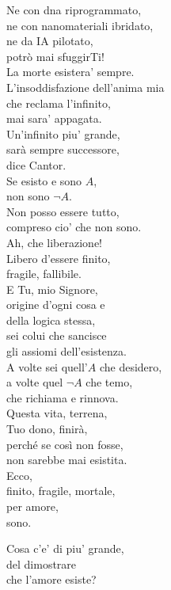 \begin{haiku}
    Ne con dna riprogrammato,\\
    ne con nanomateriali ibridato, \\
    ne da IA pilotato, \\
    potrò mai sfuggirTi! \\
    La morte esistera' sempre.\\
    L'insoddisfazione dell'anima mia\\
    che reclama l'infinito,\\
    mai sara' appagata.\\
    Un'infinito piu' grande,\\
    sarà sempre successore,\\
    dice Cantor. \\
    Se esisto e sono $A$,\\
    non sono $\lnot A$.\\
    Non posso essere tutto,\\
    compreso cio' che non sono.\\
    Ah, che liberazione!\\
    Libero d'essere finito, \\
	fragile, fallibile.\\
    E Tu, mio Signore,\\
    origine d'ogni cosa e\\
    della logica stessa,\\
    sei colui che sancisce\\
    gli assiomi dell'esistenza.\\
    A volte sei quell'$A$ che desidero,\\
    a volte quel $\lnot A$ che temo,\\
    che richiama e rinnova.\\
    Questa vita, terrena, \\
    Tuo dono, finirà,\\
    perché se così non fosse,\\
    non sarebbe mai esistita.\\
    Ecco,\\
    finito, fragile, mortale,\\
    per amore,\\
    sono.\\
\end{haiku}

\begin{haiku}
    Cosa c'e' di piu' grande,\\
    del dimostrare\\
    che l'amore esiste?\\
\end{haiku}

